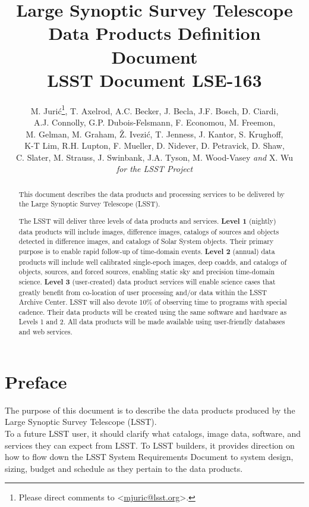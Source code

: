 \documentclass[12pt]{article}
\title{\vskip -1in Large Synoptic Survey Telescope \\
Data Products Definition Document \\
{\small \bf LSST Document LSE-163}}
\author{
{\small M. Juri\'c}\footnote{Please direct comments to \textless\href{mailto:mjuric@lsst.org}{mjuric@lsst.org}\textgreater.},
{\small T. Axelrod, A.C. Becker, J. Becla, J.F. Bosch, D. Ciardi, } \\
{\small A.J. Connolly,  G.P. Dubois-Felsmann, F. Economou, M. Freemon, } \\
{\small M. Gelman, M. Graham, \v{Z}. Ivezi\'c, T. Jenness,  J. Kantor, S. Krughoff, } \\
{\small K-T Lim,  R.H. Lupton, F. Mueller, D. Nidever, D. Petravick, D. Shaw, } \\
{\small C. Slater, M. Strauss, J. Swinbank, J.A. Tyson, M. Wood-Vasey \emph{and} X. Wu} \vspace{1.2ex} \\
{\small \emph{for the LSST Project}}
}
\begin{document}
\maketitle
\pagestyle{headings}

\begin{abstract}
This document describes the data products and processing services to be delivered by the Large Synoptic Survey Telescope (LSST).

The LSST will deliver three levels of data products and services. \textbf{Level 1} (nightly) data products will include images, difference images, catalogs of sources and objects detected in difference images, and catalogs of Solar System objects. Their primary purpose is to enable rapid follow-up of time-domain events. \textbf{Level 2} (annual) data products will include well calibrated single-epoch images, deep coadds, and catalogs of objects, sources, and forced sources, enabling static sky and precision time-domain science. \textbf{Level 3} (user-created) data product services will enable science cases that greatly benefit from co-location of user processing and/or data within the LSST Archive Center. LSST will also devote 10\% of observing time to programs with special cadence. Their data products will be created using the same software and hardware as Levels 1 and 2. All data products will be made available using user-friendly databases and web services.

\end{abstract}

\clearpage

\tableofcontents

\clearpage

\section{Preface}

The purpose of this document is to describe the data products produced by the Large Synoptic Survey Telescope (LSST).
\\

To a future LSST user, it should clarify what catalogs, image data, software, and services they can expect from LSST. To LSST builders, it provides direction on how to flow down the LSST System Requirements Document to system design, sizing, budget and schedule as they pertain to the data products.
\\
\end{document}
